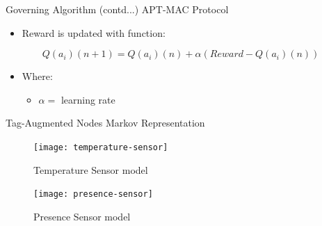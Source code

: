 \documentclass [xcolor=svgnames, t] {beamer}
\begin{document}
\begin{frame}{Governing Algorithm (contd...)}
    APT-MAC Protocol\\
    \vspace{.5cm}
    \begin{itemize}
        \item Reward is updated with function:
    \end{itemize}
    \begin{equation}
        Q(a_i)(n+1) = Q(a_i)(n)+\alpha(Reward - Q(a_i)(n))
    \end{equation}
    \begin{itemize}
        \item[] Where:
            \begin{itemize}
                \item[] $\alpha$\hspace{.25cm}$=$\hspace{.25cm} learning rate
            \end{itemize}
    \end{itemize}
\end{frame}

\begin{frame}{Tag-Augmented Nodes}
    Markov Representation\\
    \vspace{.5cm}
    \begin{figure}[ht]
        \begin{minipage}[b]{0.45\linewidth}
            \centering
            \texttt{[image: temperature-sensor]}
            \caption{Temperature Sensor model}
            \label{fig:temperature-sensor}
        \end{minipage}
        \hspace{.5cm}
        \begin{minipage}[b]{0.45\linewidth}
            \centering
            \texttt{[image: presence-sensor]}
            \caption{Presence Sensor model}
            \label{fig:presence-sensor}
        \end{minipage}
    \end{figure}
   
\end{frame}
\end{document}
